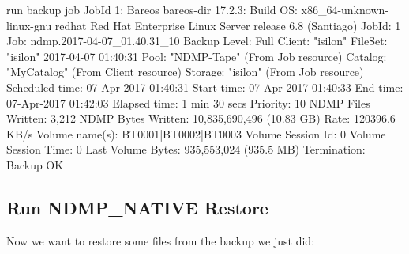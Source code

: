 \begin{bconsole}{run backup job}
JobId 1: Bareos bareos-dir 17.2.3:
  Build OS:               x86_64-unknown-linux-gnu redhat Red Hat Enterprise Linux Server release 6.8 (Santiago)
  JobId:                  1
  Job:                    ndmp.2017-04-07_01.40.31_10
  Backup Level:           Full
  Client:                 "isilon"
  FileSet:                "isilon" 2017-04-07 01:40:31
  Pool:                   "NDMP-Tape" (From Job resource)
  Catalog:                "MyCatalog" (From Client resource)
  Storage:                "isilon" (From Job resource)
  Scheduled time:         07-Apr-2017 01:40:31
  Start time:             07-Apr-2017 01:40:33
  End time:               07-Apr-2017 01:42:03
  Elapsed time:           1 min 30 secs
  Priority:               10
  NDMP Files Written:     3,212
  NDMP Bytes Written:     10,835,690,496 (10.83 GB)
  Rate:                   120396.6 KB/s
  Volume name(s):         BT0001|BT0002|BT0003
  Volume Session Id:      0
  Volume Session Time:    0
  Last Volume Bytes:      935,553,024 (935.5 MB)
  Termination:            Backup OK
\end{bconsole}



\subsection{Run NDMP\_NATIVE Restore}

Now we want to restore some files from the backup we just did:

